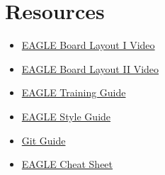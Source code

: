 \documentclass{article}
\begin{document}
\section{Resources}
\begin{itemize}
    \item \href{https://www.youtube.com/watch?v=3TP1JzrRRHs&list=PL1R5gSylLha2iQ7e9mwiXJDY2RXoM8HxK&index=4}{EAGLE Board Layout I Video}
    \item \href{https://www.youtube.com/watch?v=w4isa5e_Vow&list=PL1R5gSylLha2iQ7e9mwiXJDY2RXoM8HxK&index=5}{EAGLE Board Layout II Video}
    \item \href{https://github.com/RoboJackets/electrical-training/tree/master/references/eagle_training_guide}{EAGLE Training Guide}
    \item \href{https://wiki.robojackets.org/EAGLE_Style_Guide}{EAGLE Style Guide}
    \item \href{https://github.com/RoboJackets/robocup-firmware/blob/master/doc/Git.md}{Git Guide}
    \item \href{https://github.com/RoboJackets/electrical-training/blob/master/references/eagle_cheat_sheet/eagle_cheat_sheet.pdf}{EAGLE Cheat Sheet}
\end{itemize}
\end{document}
